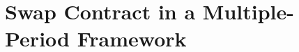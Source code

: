 \documentclass[main.tex]{subfiles}
\begin{document}
    \section{Swap Contract in a Multiple-Period Framework}

    
\end{document}
